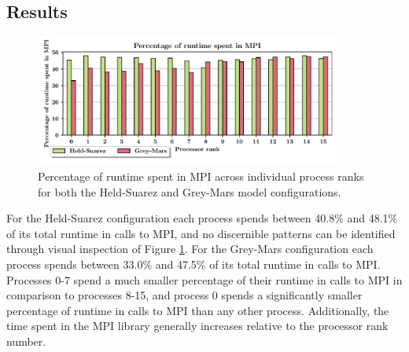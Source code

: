 \documentclass[a4paper,11pt]{report}
\begin{document}
\subsection{Results}
\begin{figure}[htbp]
\begin{center}
	\includegraphics[width=0.9\textwidth]{img/mpi-barrier-time.pdf}
\caption[Percentage of runtime spent in MPI across processes]{Percentage of runtime spent in MPI across individual process ranks for both the Held-Suarez and Grey-Mars model configurations.}
\label{fig:mpi-barrier}
\end{center}
\end{figure}
For the Held-Suarez configuration each process spends between 40.8\% and 48.1\% of its total runtime in calls to MPI, and no discernible patterns can be identified through visual inspection of Figure \ref{fig:mpi-barrier}. For the Grey-Mars configuration each process spends between 33.0\% and 47.5\% of its total runtime in calls to MPI. Processes 0-7 spend a much smaller percentage of their runtime in calls to MPI in comparison to processes 8-15, and process 0 spends a significantly smaller percentage of runtime in calls to MPI than any other process. Additionally, the time spent in the MPI library generally increases relative to the processor rank number. 
\par
\end{document}

